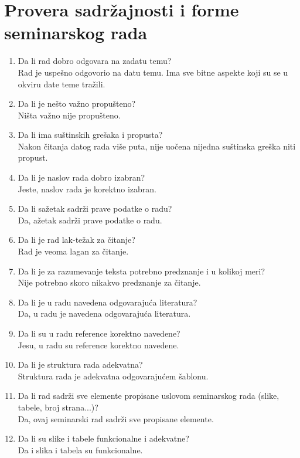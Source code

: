 \documentclass[a4paper]{report}
\begin{document}
\section{Provera sadržajnosti i forme seminarskog rada}

\begin{enumerate}
\item Da li rad dobro odgovara na zadatu temu?\\
Rad je uspešno odgovorio na datu temu. Ima sve bitne aspekte koji su se u okviru date teme tražili.
\item Da li je nešto važno propušteno?\\
Ništa važno nije propušteno.
\item Da li ima suštinskih grešaka i propusta?\\
Nakon čitanja datog rada više puta, nije uočena nijedna suštinska greška niti propust.
\item Da li je naslov rada dobro izabran?\\
Jeste, naslov rada je korektno izabran.
\item Da li sažetak sadrži prave podatke o radu?\\ Da, ažetak sadrži prave podatke o radu.
\item Da li je rad lak-težak za čitanje?\\
Rad je veoma lagan za čitanje.
\item Da li je za razumevanje teksta potrebno predznanje i u kolikoj meri?\\
Nije potrebno skoro nikakvo predznanje za čitanje.
\item Da li je u radu navedena odgovarajuća literatura?\\
Da, u radu je navedena odgovarajuća literatura.
\item Da li su u radu reference korektno navedene?\\
Jesu, u radu su reference korektno navedene.
\item Da li je struktura rada adekvatna?\\
Struktura rada je adekvatna odgovarajućem šablonu.
\item Da li rad sadrži sve elemente propisane uslovom seminarskog rada (slike, tabele, broj strana...)?\\
Da, ovaj seminarski rad sadrži sve propisane elemente.
\item Da li su slike i tabele funkcionalne i adekvatne?\\
Da i slika i tabela su funkcionalne.
\end{enumerate}
\end{document}
